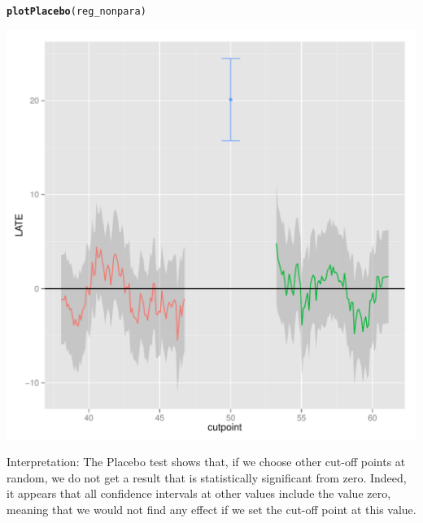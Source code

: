 \documentclass[12pt]{article}\usepackage[]{graphicx}\usepackage[]{color}
\makeatletter
\def\maxwidth{ %
  \ifdim\Gin@nat@width>\linewidth
    \linewidth
  \else
    \Gin@nat@width
  \fi
}
\newcommand{\hlstd}[1]{\textcolor[rgb]{0.345,0.345,0.345}{#1}}%
\newcommand{\hlkwd}[1]{\textcolor[rgb]{0.737,0.353,0.396}{\textbf{#1}}}%
\newenvironment{kframe}{%
 \def\at@end@of@kframe{}%
 \ifinner\ifhmode%
  \def\at@end@of@kframe{\end{minipage}}%
  \begin{minipage}{\columnwidth}%
 \fi\fi%
 \def\FrameCommand##1{\hskip\@totalleftmargin \hskip-\fboxsep
 \colorbox{shadecolor}{##1}\hskip-\fboxsep
     \hskip-\linewidth \hskip-\@totalleftmargin \hskip\columnwidth}%
 \MakeFramed {\advance\hsize-\width
   \@totalleftmargin\z@ \linewidth\hsize
   \@setminipage}}%
 {\par\unskip\endMakeFramed%
 \at@end@of@kframe}
\newenvironment{knitrout}{}{} %
\makeatother
\begin{document}
\begin{knitrout}
\color{fgcolor}\begin{kframe}
\begin{alltt}
\hlkwd{plotPlacebo}\hlstd{(reg_nonpara)}
\end{alltt}
\end{kframe}
\includegraphics[width=\maxwidth]{figure/unnamed-chunk-14-1} 

\end{knitrout}

Interpretation: The Placebo test shows that, if we choose other cut-off points at random, we do not get a result that is statistically significant from zero. Indeed, it appears that all confidence intervals at other values include the value zero, meaning that we would not find any effect if we set the cut-off point at this value.
\end{document}
